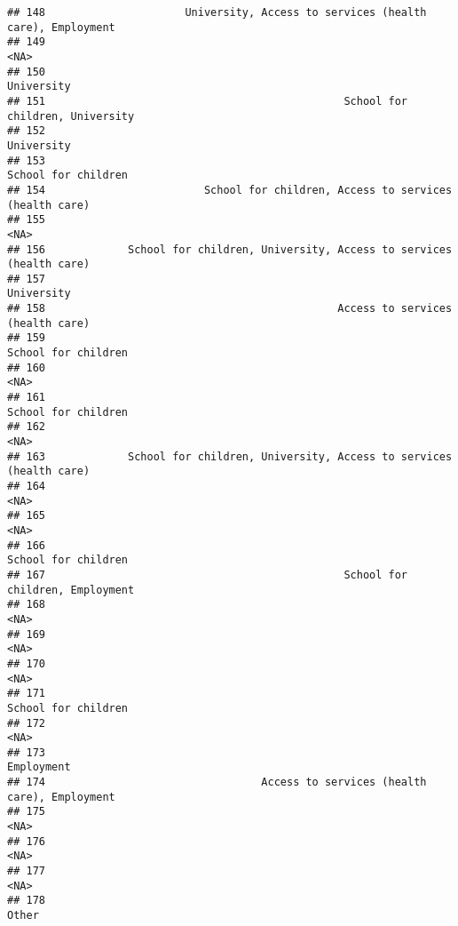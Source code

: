 \documentclass[
]{article}
\begin{document}
\begin{verbatim}
## 148                      University, Access to services (health care), Employment
## 149                                                                          <NA>
## 150                                                                    University
## 151                                               School for children, University
## 152                                                                    University
## 153                                                           School for children
## 154                         School for children, Access to services (health care)
## 155                                                                          <NA>
## 156             School for children, University, Access to services (health care)
## 157                                                                    University
## 158                                              Access to services (health care)
## 159                                                           School for children
## 160                                                                          <NA>
## 161                                                           School for children
## 162                                                                          <NA>
## 163             School for children, University, Access to services (health care)
## 164                                                                          <NA>
## 165                                                                          <NA>
## 166                                                           School for children
## 167                                               School for children, Employment
## 168                                                                          <NA>
## 169                                                                          <NA>
## 170                                                                          <NA>
## 171                                                           School for children
## 172                                                                          <NA>
## 173                                                                    Employment
## 174                                  Access to services (health care), Employment
## 175                                                                          <NA>
## 176                                                                          <NA>
## 177                                                                          <NA>
## 178                                                                         Other

\end{verbatim}
\end{document}
